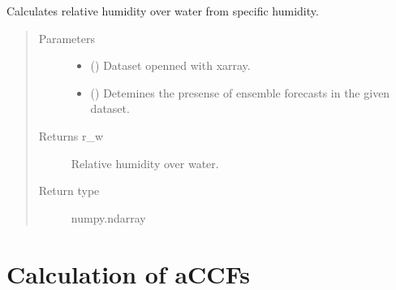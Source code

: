\documentclass[a4paper,11pt,english]{sphinxmanual}
\begin{document}
\begin{fulllineitems}
\label{\detokenize{modules:envlib.contrail.get_rw_from_specific_hum}}
Calculates relative humidity over water from specific humidity.
\begin{quote}\begin{description}
\item[{Parameters}] \leavevmode\begin{itemize}
\item {} 
 () \textendash{} Dataset openned with xarray.

\item {} 
 () \textendash{} Detemines the presense of ensemble forecasts in the given dataset.

\end{itemize}

\item[{Returns r\_w}] \leavevmode
Relative humidity over water.

\item[{Return type}] \leavevmode
numpy.ndarray

\end{description}\end{quote}

\end{fulllineitems}



\section{Calculation of aCCFs}
\label{\detokenize{modules:calculation-of-accfs}}
\end{document}
